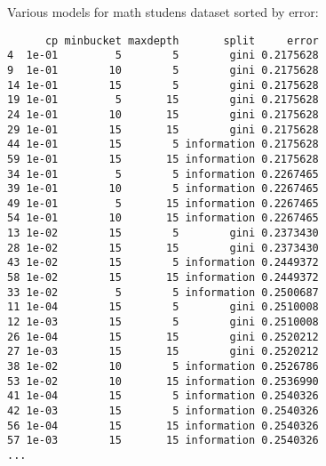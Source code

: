 Various models for math studens dataset sorted by error:
\begin{verbatim}
      cp minbucket maxdepth       split     error
4  1e-01         5        5        gini 0.2175628
9  1e-01        10        5        gini 0.2175628
14 1e-01        15        5        gini 0.2175628
19 1e-01         5       15        gini 0.2175628
24 1e-01        10       15        gini 0.2175628
29 1e-01        15       15        gini 0.2175628
44 1e-01        15        5 information 0.2175628
59 1e-01        15       15 information 0.2175628
34 1e-01         5        5 information 0.2267465
39 1e-01        10        5 information 0.2267465
49 1e-01         5       15 information 0.2267465
54 1e-01        10       15 information 0.2267465
13 1e-02        15        5        gini 0.2373430
28 1e-02        15       15        gini 0.2373430
43 1e-02        15        5 information 0.2449372
58 1e-02        15       15 information 0.2449372
33 1e-02         5        5 information 0.2500687
11 1e-04        15        5        gini 0.2510008
12 1e-03        15        5        gini 0.2510008
26 1e-04        15       15        gini 0.2520212
27 1e-03        15       15        gini 0.2520212
38 1e-02        10        5 information 0.2526786
53 1e-02        10       15 information 0.2536990
41 1e-04        15        5 information 0.2540326
42 1e-03        15        5 information 0.2540326
56 1e-04        15       15 information 0.2540326
57 1e-03        15       15 information 0.2540326
...
\end{verbatim}


